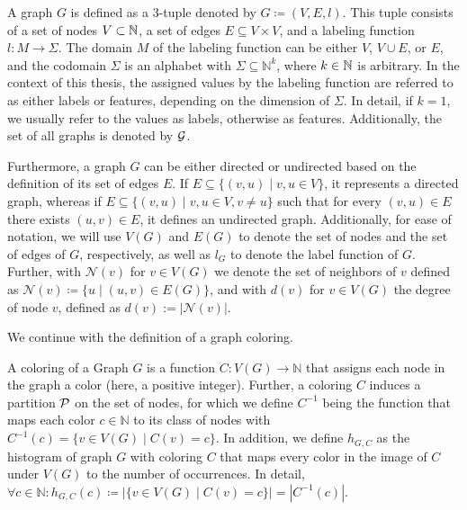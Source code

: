 \begin{definition}[Graph]
A graph $G$ is defined as a 3-tuple denoted by $G \coloneqq (V, E, l)$. This tuple consists of a set of nodes $V \subset \mathbb{N}$, a set of edges $E \subseteq V \times V$, and a labeling function $l: M \rightarrow \Sigma$. The domain $M$ of the labeling function can be either $V$, $V \cup E$, or $E$, and the codomain $\Sigma$ is an alphabet with $\Sigma \subseteq \mathbb{N}^k$, where $k \in \mathbb{N}$ is arbitrary.
In the context of this thesis, the assigned values by the labeling function are referred to as either labels or features, depending on the dimension of $\Sigma$. In detail, if $k=1$, we usually refer to the values as labels, otherwise as features. Additionally, the set of all graphs is denoted by $\mathcal{G}$.

Furthermore, a graph $G$ can be either directed or undirected based on the definition of its set of edges $E$. If $E \subseteq \{(v,u) \mid v,u \in V\}$, it represents a directed graph, whereas if $E \subseteq \{(v, u) \mid v,u \in V, v\neq u\}$ such that for every $(v,u) \in E$ there exists $(u,v) \in E$, it defines an undirected graph. Additionally, for ease of notation, we will use $V(G)$ and $E(G)$ to denote the set of nodes and the set of edges of $G$, respectively, as well as $l_G$ to denote the label function of $G$. Further, with $\mathcal{N}(v)$ for $v \in V(G)$ we denote the set of neighbors of $v$ defined as $\mathcal{N}(v) \coloneqq \{u \mid (u, v) \in E(G)\}$, and with $d(v)$ for $v \in V(G)$ the degree of node $v$, defined as $d(v) := |\mathcal{N}(v)|$.
\end{definition}

We continue with the definition of a graph coloring.

\begin{definition}
A coloring of a Graph $G$ is a function $C: V(G) \rightarrow \mathbb{N}$ that assigns each node in the graph a color (here, a positive integer). Further, a coloring $C$ induces a partition $\mathcal{P}$ on the set of nodes, for which we define $C^{-1}$ being the function that maps each color $c \in \mathbb{N}$ to its class of nodes with $C^{-1}(c) = \{ v\in V(G) \mid C(v) = c\}$. In addition, we define $h_{G, C}$ as the histogram of graph $G$ with coloring $C$ that maps every color in the image of $C$ under $V(G)$ to the number of occurrences. In detail, $\forall c \in \mathbb{N}: h_{G, C}(c) \coloneqq | \{ v \in V(G) \mid C(v) = c \} | = | C^{-1}(c) |$.
\end{definition}

